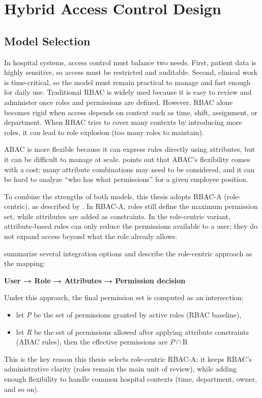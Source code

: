 \section{Hybrid Access Control Design}

\subsection{Model Selection}
In hospital systems, access control must balance two needs. First, patient data is highly sensitive, so access must be restricted and auditable. Second, clinical work is time-critical, so the model must remain practical to manage and fast enough for daily use. Traditional RBAC is widely used because it is easy to review and administer once roles and permissions are defined. However, RBAC alone becomes rigid when access depends on context such as time, shift, assignment, or department. When RBAC tries to cover many contexts by introducing more roles, it can lead to role explosion (too many roles to maintain). \cite{KuhnCoyneWeil2010, Ferraiolo2007RBAC2E}
\vspace{0.5cm}


ABAC is more flexible because it can express rules directly using attributes, but it can be difficult to manage at scale. \cite{KuhnCoyneWeil2010} points out that ABAC’s flexibility comes with a cost: many attribute combinations may need to be considered, and it can be hard to analyze “who has what permissions” for a given employee position.
\vspace{0.5cm}


To combine the strengths of both models, this thesis adopts RBAC-A (role-centric), as described by \cite{KuhnCoyneWeil2010}. In RBAC-A, roles still define the maximum permission set, while attributes are added as constraints. In the role-centric variant, attribute-based rules can only reduce the permissions available to a user; they do not expand access beyond what the role already allows.
\vspace{0.5cm}


\cite{KuhnCoyneWeil2010} summarize several integration options and describe the role-centric approach as the mapping:


\textbf{User → Role → Attributes → Permission decision }

Under this approach, the final permission set is computed as an intersection:

\begin{itemize}
    \item let \emph{P} be the set of permissions granted by active roles (RBAC baseline),
    \item let \emph{R} be the set of permissions allowed after applying attribute constraints (ABAC rules),
then the effective permissions are $P \cap $R
\end{itemize}
This is the key reason this thesis selects role-centric RBAC-A: it keeps RBAC’s administrative clarity (roles remain the main unit of review), while adding enough flexibility to handle common hospital contexts (time, department, owner, and so on). 

